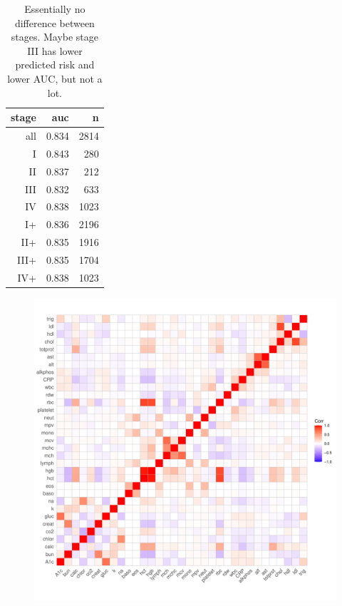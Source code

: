 \documentclass[12pt]{article}
\begin{document}
\begin{table}[ht]
\centering
\begin{tabular}{rrr}
  \hline
stage & auc & n \\ 
  \hline
all & 0.834 & 2814 \\ 
  \addlinespace
  I & 0.843 & 280 \\ 
  II & 0.837 & 212 \\ 
  III & 0.832 & 633 \\ 
  IV & 0.838 & 1023 \\ 
  \addlinespace
  I+ & 0.836 & 2196 \\ 
  II+ & 0.835 & 1916 \\ 
  III+ & 0.835 & 1704 \\ 
  IV+ & 0.838 & 1023 \\ 
   \hline
\end{tabular}
\caption{Essentially no difference between stages. Maybe stage III has lower
predicted risk and lower AUC, but not a lot.}
\end{table}



\clearpage


\begin{figure}[h]
\centering
\includegraphics[width=\textwidth]{figures/lab_corr.pdf}
\end{figure}
\end{document}
